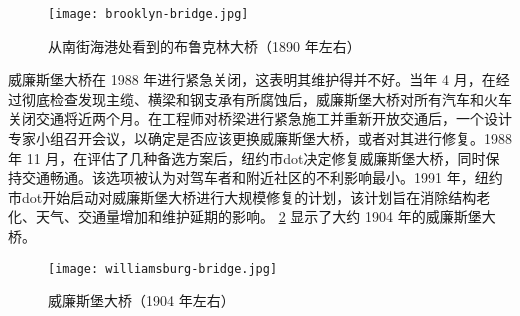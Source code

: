 \begin{figure}
  \texttt{[image: brooklyn-bridge.jpg]}
  \caption{从南街海港处看到的布鲁克林大桥（1890 年左右）}
  \label{fig:brooklyn-bridge}
\end{figure}

威廉斯堡大桥在 1988 年进行紧急关闭，这表明其维护得并不好。当年 4 月，在经过彻底检查发现主缆、横梁和钢支承有所腐蚀后，威廉斯堡大桥对所有汽车和火车关闭交通将近两个月。在工程师对桥梁进行紧急施工并重新开放交通后，一个设计专家小组召开会议，以确定是否应该更换威廉斯堡大桥，或者对其进行修复。1988 年 11 月，在评估了几种备选方案后，纽约市\acrfull{dot}决定修复威廉斯堡大桥，同时保持交通畅通。该选项被认为对驾车者和附近社区的不利影响最小。1991 年，纽约市\acrlong{dot}开始启动对威廉斯堡大桥进行大规模修复的计划，该计划旨在消除结构老化、天气、交通量增加和维护延期的影响。 \cref{fig:williamsburg-bridge} 显示了大约 1904 年的威廉斯堡大桥。

\begin{figure}
  \centering
  \texttt{[image: williamsburg-bridge.jpg]}
  \caption{威廉斯堡大桥（1904 年左右）}
  \label{fig:williamsburg-bridge}
\end{figure}

